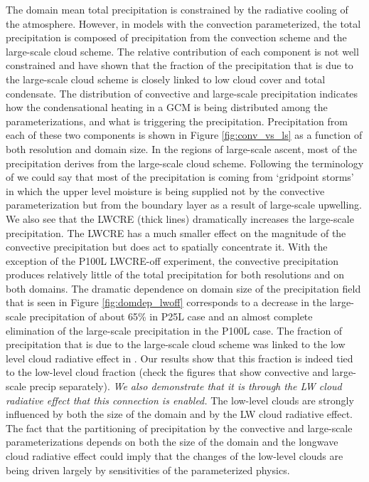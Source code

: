 \documentclass[draft]{agujournal2019}
\begin{document}
{The domain mean total precipitation is constrained by the radiative cooling of the atmosphere.  
However, in models with the convection parameterized, the 
total precipitation is composed of precipitation from the convection scheme and the large-scale cloud scheme. 
The relative contribution of each component is not well constrained and  have shown 
that the fraction of the precipitation that is due to the large-scale cloud scheme is closely linked 
to low cloud cover and total condensate.  
The distribution of convective and large-scale precipitation indicates how the condensational heating
in a GCM is being distributed among the parameterizations, and what is triggering the precipitation.  
Precipitation from each of these two components is shown in Figure \ref{fig:conv_vs_ls} as a function of 
both resolution and domain size.  In the regions of large-scale ascent, most of the precipitation derives 
from the large-scale cloud scheme.  Following the terminology of  we could say that most 
of the precipitation is coming from `gridpoint storms' in which the upper level moisture is being supplied not 
by the convective parameterization but from the boundary layer as a result of large-scale upwelling.
We also see that the LWCRE (thick lines) dramatically increases
the large-scale precipitation.  The LWCRE has a much smaller effect on the magnitude of the convective 
precipitation but does act to spatially concentrate it.  With the exception 
of the P100L LWCRE-off experiment, the convective precipitation produces relatively little of the total precipitation for 
both resolutions and on both domains.  The dramatic dependence on domain size of the precipitation field that is 
seen in Figure \ref{fig:domdep_lwoff} corresponds to a decrease in the large-scale precipitation of about 65\% in P25L case
and an almost complete elimination of the large-scale precipitation in the P100L case.    
The fraction of precipitation that is due to the large-scale cloud scheme was linked to the low level cloud radiative
effect in . Our results show that this fraction is indeed tied to the low-level cloud fraction (check 
the figures that show convective and large-scale precip separately).  
\textit{We also demonstrate that it is through the LW cloud radiative effect that this connection is enabled.}
The low-level clouds are strongly influenced by both the size of the domain and by the LW cloud 
radiative effect.  The fact that the partitioning of precipitation by the convective and large-scale 
parameterizations depends on both the size of the domain and the longwave cloud 
radiative effect could imply that the changes of the low-level clouds are being driven largely by 
sensitivities of the parameterized physics.  


}
\end{document}
